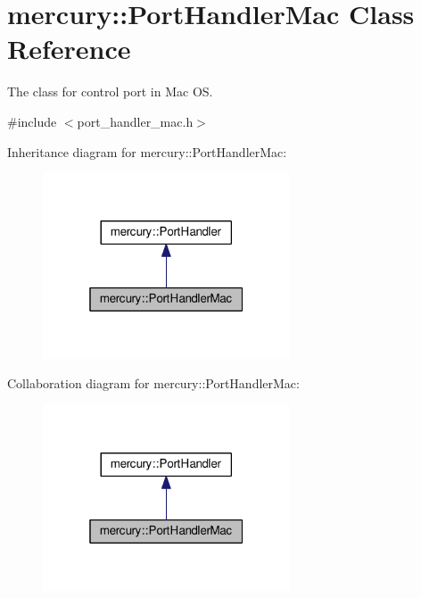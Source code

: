 \hypertarget{classmercury_1_1_port_handler_mac}{}\section{mercury\+:\+:Port\+Handler\+Mac Class Reference}
\label{classmercury_1_1_port_handler_mac}


The class for control port in Mac OS.  




{\ttfamily \#include $<$port\+\_\+handler\+\_\+mac.\+h$>$}



Inheritance diagram for mercury\+:\+:Port\+Handler\+Mac\+:\nopagebreak
\begin{figure}[H]
\begin{center}
\leavevmode
\includegraphics[width=208pt]{classmercury_1_1_port_handler_mac__inherit__graph}
\end{center}
\end{figure}


Collaboration diagram for mercury\+:\+:Port\+Handler\+Mac\+:\nopagebreak
\begin{figure}[H]
\begin{center}
\leavevmode
\includegraphics[width=208pt]{classmercury_1_1_port_handler_mac__coll__graph}
\end{center}
\end{figure}
